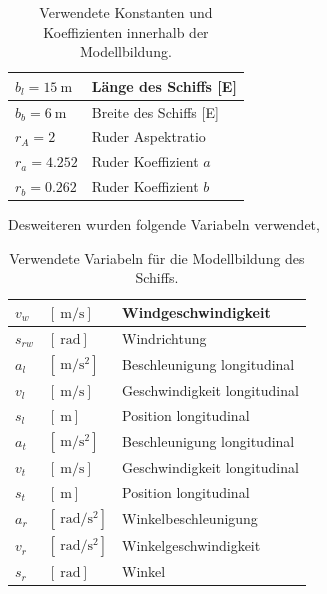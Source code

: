 \documentclass[]{iat}
\begin{document}
\begin{table}[H]
\begin{tabular}{l|l}
        $b_l = \SI{15}{\m}$              & Länge des Schiffs [E]                                                              \\ \hline
        $b_b = \SI{6}{\m}$               & Breite des Schiffs [E]                                                             \\ \hline
        $r_A  = 2$                       & Ruder Aspektratio \cite[]{Kulczyk_Tabaczek_2014_2}                                 \\ \hline
        $r_a = 4.252$                    & Ruder Koeffizient $a$ \cite[]{Kulczyk_Tabaczek_2014_2}                             \\ \hline
        $r_b = 0.262$                    & Ruder Koeffizient $b$ \cite[]{Kulczyk_Tabaczek_2014_2}
    \end{tabular}
    \caption{Verwendete Konstanten und Koeffizienten innerhalb der Modellbildung.}
    \label{tab:constants}
\end{table}

Desweiteren wurden folgende Variabeln verwendet,
\begin{table}[H]
    \begin{tabular}{ll|l}
        $v_w$    & $[\SI{}{\m\per\s}]$              & Windgeschwindigkeit          \\ \hline
        $s_{rw}$ & $[\SI{}{\radian}]$               & Windrichtung                 \\ \hline
        $a_l$    & $[\SI{}{\m\per\s\squared}]$      & Beschleunigung longitudinal  \\ \hline
        $v_l$    & $[\SI{}{\m\per\s}]$              & Geschwindigkeit longitudinal \\ \hline
        $s_l$    & $[\SI{}{\m}]$                    & Position longitudinal        \\ \hline
        $a_t$    & $[\SI{}{\m\per\s\squared}]$      & Beschleunigung longitudinal  \\ \hline
        $v_t$    & $[\SI{}{\m\per\s}]$              & Geschwindigkeit longitudinal \\ \hline
        $s_t$    & $[\SI{}{\m}]$                    & Position longitudinal        \\ \hline
        $a_r$    & $[\SI{}{\radian\per\s\squared}]$ & Winkelbeschleunigung         \\ \hline
        $v_r$    & $[\SI{}{\radian\per\s\squared}]$ & Winkelgeschwindigkeit        \\ \hline
        $s_r$    & $[\SI{}{\radian}]$               & Winkel
    \end{tabular}
    \caption{Verwendete Variabeln für die Modellbildung des Schiffs.}
    \label{tab:variables}
\end{table}
\end{document}
